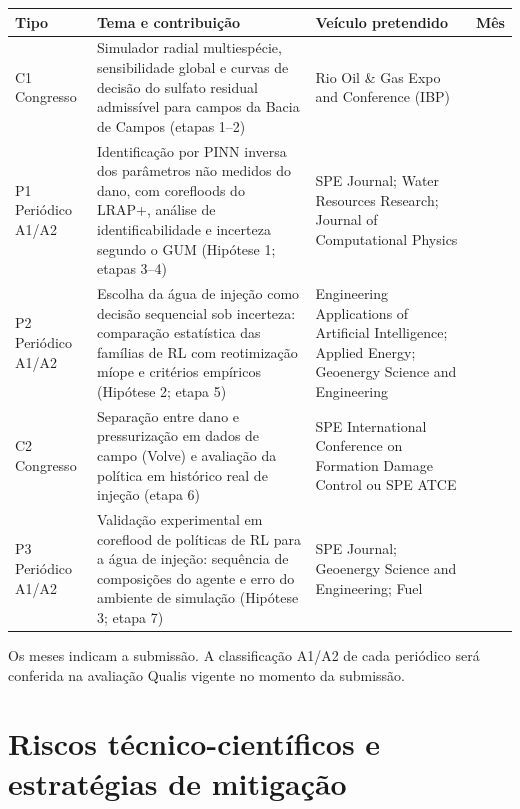 \documentclass[10pt,a4paper]{article}
\newcommand{\itemedital}[1]{}
\begin{document}
\begin{center}
\footnotesize
\renewcommand{\arraystretch}{1.05}
\begin{tabularx}{\textwidth}{@{}>{\raggedright\arraybackslash}p{}>{\raggedright\arraybackslash}X>{\raggedright\arraybackslash}p{}>{\centering\arraybackslash}p{}@{}}
\toprule
\textbf{Tipo} & \textbf{Tema e contribuição} & \textbf{Veículo pretendido} & \textbf{Mês} \\
\midrule
C1 Congresso & Simulador radial multiespécie, sensibilidade global e curvas de decisão do sulfato residual admissível para campos da Bacia de Campos (etapas 1--2) & Rio Oil \& Gas Expo and Conference (IBP) & 20 \\
P1 Periódico A1/A2 & Identificação por PINN inversa dos parâmetros não medidos do dano, com corefloods do LRAP+, análise de identificabilidade e incerteza segundo o GUM (Hipótese 1; etapas 3--4) & SPE Journal; Water Resources Research; Journal of Computational Physics & 28 \\
P2 Periódico A1/A2 & Escolha da água de injeção como decisão sequencial sob incerteza: comparação estatística das famílias de RL com reotimização míope e critérios empíricos (Hipótese 2; etapa 5) & Engineering Applications of Artificial Intelligence; Applied Energy; Geoenergy Science and Engineering & 36 \\
C2 Congresso & Separação entre dano e pressurização em dados de campo (Volve) e avaliação da política em histórico real de injeção (etapa 6) & SPE International Conference on Formation Damage Control ou SPE ATCE & 40 \\
P3 Periódico A1/A2 & Validação experimental em coreflood de políticas de RL para a água de injeção: sequência de composições do agente e erro do ambiente de simulação (Hipótese 3; etapa 7) & SPE Journal; Geoenergy Science and Engineering; Fuel & 46 \\
\bottomrule
\end{tabularx}
\end{center}

\noindent Os meses indicam a submissão. A classificação A1/A2 de cada periódico será
conferida na avaliação Qualis vigente no momento da submissão.

\section{Riscos técnico-científicos e estratégias de mitigação}\itemedital{2.16 XVII}
\end{document}
